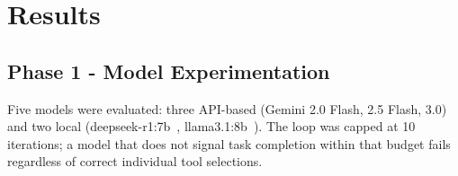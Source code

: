 \documentclass[1p,12pt]{elsarticle}
\begin{document}
\begin{table}[H]
  \caption{MONAI segmentation inference times across hardware configurations for PANCREAS\_0001. 
 M1=\texttt{spleen\_ct\_segmentation}; M2=\texttt{wholeBody\_ct\_segmentation}; M3=\texttt{pancreas\_ct\_dints\_segmentation}.}
  \label{tab:inference-results}
  \centering
  \small
\end{table}

\section{Results}
\label{sec:results}

\subsection{Phase 1  -  Model Experimentation}
Five models were evaluated: three API-based (Gemini 2.0 Flash, 2.5 Flash, 3.0)~\cite{gemini2025} and two local (deepseek-r1:7b~\cite{deepseekr1}, llama3.1:8b~\cite{llama31}). The loop was capped at 10 iterations; a model that does not signal task completion within that budget fails regardless of correct individual tool selections.
\end{document}
